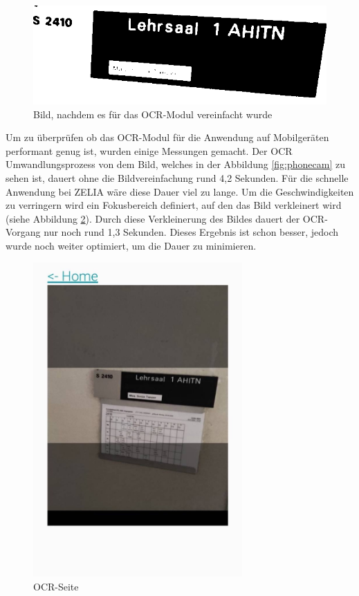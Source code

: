 \begin{figure}
    \centering
    \includegraphics[width=120mm]{media/OCR/compressed}
    \caption{Bild, nachdem es für das OCR-Modul vereinfacht wurde}
    \label{ocroptimised}
\end{figure}


\pagebreak


Um zu überprüfen ob das OCR-Modul für die Anwendung auf Mobilgeräten performant genug ist, wurden einige Messungen gemacht. Der OCR Umwandlungsprozess von dem Bild, welches in der Abbildung \ref{fig:phonecam} zu sehen ist, dauert ohne die Bildvereinfachung rund 4,2 Sekunden. Für die schnelle Anwendung bei ZELIA wäre diese Dauer viel zu lange. Um die Geschwindigkeiten zu verringern wird ein Fokusbereich definiert, auf den das Bild verkleinert wird (siehe Abbildung \ref{fig:ocrfocus}). Durch diese Verkleinerung des Bildes dauert der OCR-Vorgang nur noch rund 1,3 Sekunden. Dieses Ergebnis ist schon besser, jedoch wurde noch weiter optimiert, um die Dauer zu minimieren. 

\begin{figure}[H]
    \centering
    \includegraphics[width=80mm]{media/WebComponents/OCRSeite_light.jpg}
    \caption{OCR-Seite}
    \label{fig:ocrfocus}
\end{figure}

